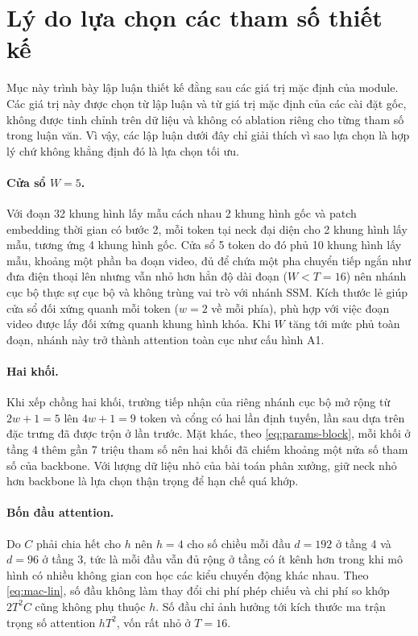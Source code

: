\section{Lý do lựa chọn các tham số thiết kế}
\label{sec:design-rationale}

Mục này trình bày lập luận thiết kế đằng sau các giá trị mặc định của module. Các giá trị này được chọn từ lập luận và từ giá trị mặc định của các cài đặt gốc, không được tinh chỉnh trên dữ liệu và không có ablation riêng cho từng tham số trong luận văn. Vì vậy, các lập luận dưới đây chỉ giải thích vì sao lựa chọn là hợp lý chứ không khẳng định đó là lựa chọn tối ưu.

\paragraph{Cửa sổ $W = 5$.} Với đoạn 32 khung hình lấy mẫu cách nhau 2 khung hình gốc và patch embedding thời gian có bước 2, mỗi token tại neck đại diện cho 2 khung hình lấy mẫu, tương ứng 4 khung hình gốc. Cửa sổ 5 token do đó phủ 10 khung hình lấy mẫu, khoảng một phần ba đoạn video, đủ để chứa một pha chuyển tiếp ngắn như đưa điện thoại lên nhưng vẫn nhỏ hơn hẳn độ dài đoạn ($W < T = 16$) nên nhánh cục bộ thực sự cục bộ và không trùng vai trò với nhánh SSM. Kích thước lẻ giúp cửa sổ đối xứng quanh mỗi token ($w = 2$ về mỗi phía), phù hợp với việc đoạn video được lấy đối xứng quanh khung hình khóa. Khi $W$ tăng tới mức phủ toàn đoạn, nhánh này trở thành attention toàn cục như cấu hình A1.

\paragraph{Hai khối.} Khi xếp chồng hai khối, trường tiếp nhận của riêng nhánh cục bộ mở rộng từ $2w + 1 = 5$ lên $4w + 1 = 9$ token và cổng có hai lần định tuyến, lần sau dựa trên đặc trưng đã được trộn ở lần trước. Mặt khác, theo \cref{eq:params-block}, mỗi khối ở tầng 4 thêm gần 7 triệu tham số nên hai khối đã chiếm khoảng một nửa số tham số của backbone. Với lượng dữ liệu nhỏ của bài toán phân xưởng, giữ neck nhỏ hơn backbone là lựa chọn thận trọng để hạn chế quá khớp.

\paragraph{Bốn đầu attention.} Do $C$ phải chia hết cho $h$ nên $h = 4$ cho số chiều mỗi đầu $d = 192$ ở tầng 4 và $d = 96$ ở tầng 3, tức là mỗi đầu vẫn đủ rộng ở tầng có ít kênh hơn trong khi mô hình có nhiều không gian con học các kiểu chuyển động khác nhau. Theo \cref{eq:mac-lin}, số đầu không làm thay đổi chi phí phép chiếu và chi phí so khớp $2T^2C$ cũng không phụ thuộc $h$. Số đầu chỉ ảnh hưởng tới kích thước ma trận trọng số attention $hT^2$, vốn rất nhỏ ở $T = 16$.

